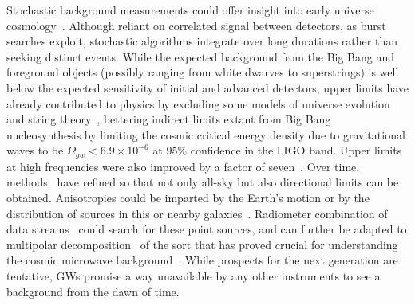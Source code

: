 Stochastic background measurements could offer insight into early universe cosmology~\cite{Maggiore2000}.
Although reliant on correlated signal between detectors, as burst searches exploit, stochastic algorithms integrate over long durations rather than seeking distinct events.
While the expected background from the Big Bang and foreground objects (possibly ranging from white dwarves to superstrings) is well below the expected sensitivity of initial and advanced detectors, upper limits have already contributed to physics by excluding some models of universe evolution and string theory~\cite{LIGOStochasticNature2009}, bettering indirect limits extant from Big Bang nucleosynthesis by limiting the cosmic critical energy density due to gravitational waves to be $\Omega_{gw} < 6.9\times 10^{-6}$ at 95\% confidence in the LIGO band.
Upper limits at high frequencies were also improved by a factor of seven~\cite{AbadiePRDStochastic2012}.
Over time, methods~\cite{Allen1999,FotopoulosThesis,Abbott2006,Abbott2007} have refined so that not only all-sky but also directional limits can be obtained.
Anisotropies could be imparted by the Earth's motion or by the distribution of sources in this or nearby galaxies~\cite{Allen1997}.
Radiometer combination of data streams~\cite{Radiometer2006} could search for these point sources, and can further be adapted to multipolar decomposition~\cite{MeadorsCaltech2007} of the sort that has proved crucial for understanding the cosmic microwave background~\cite{Muciaccia1997}.
While prospects for the next generation are tentative, GWs promise a way unavailable by any other instruments to see a background from the dawn of time.


